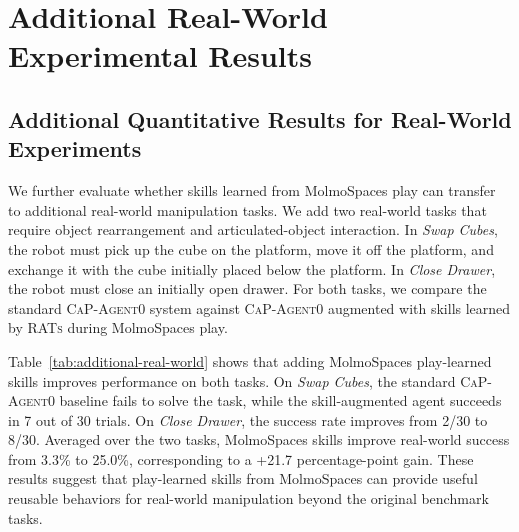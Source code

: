 
\section{Additional Real-World Experimental Results}
\label{sec:appendix_additional_realworld}

\subsection{Additional Quantitative Results for Real-World Experiments}

We further evaluate whether skills learned from MolmoSpaces play can transfer to additional
real-world manipulation tasks. We add two real-world tasks that require object rearrangement and
articulated-object interaction. In \textit{Swap Cubes}, the robot must pick up the cube on the
platform, move it off the platform, and exchange it with the cube initially placed below the platform.
In \textit{Close Drawer}, the robot must close an initially open drawer. For both tasks, we compare
the standard \textsc{CaP-Agent0} system against \textsc{CaP-Agent0} augmented with skills learned
by \textsc{RATs} during MolmoSpaces play.

Table~\ref{tab:additional-real-world} shows that adding MolmoSpaces play-learned skills improves
performance on both tasks. On \textit{Swap Cubes}, the standard \textsc{CaP-Agent0} baseline fails
to solve the task, while the skill-augmented agent succeeds in 7 out of 30 trials. On
\textit{Close Drawer}, the success rate improves from 2/30 to 8/30. Averaged over the two tasks,
MolmoSpaces skills improve real-world success from 3.3\% to 25.0\%, corresponding to a
+21.7 percentage-point gain. These results suggest that play-learned skills from MolmoSpaces can
provide useful reusable behaviors for real-world manipulation beyond the original benchmark tasks.

\begin{table}[ht]
    \centering
    \setlength{\tabcolsep}{13pt}
    \caption{\textbf{Additional real-world evaluation with MolmoSpaces skills.}
    Skills are learned by \textsc{RATs} during MolmoSpaces play and reused with the
    \textsc{CaP-Agent0} system. }
    \label{tab:additional-real-world}
\end{table}



